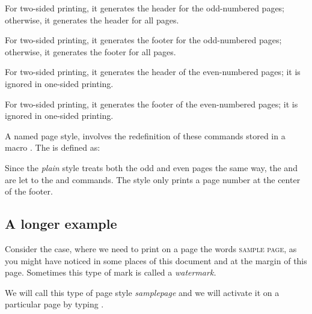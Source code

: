 \begin{marglist}
\item [\cs{oddhead}] For two-sided printing, it generates the header for the odd-numbered
pages; otherwise, it generates the header for all pages.

\item [\cs{oddfoot}] For two-sided printing, it generates the footer for the odd-numbered pages; otherwise, it generates the footer for all pages.

\item [\cs{evenhead}] For two-sided printing, it generates the header of the even-numbered
pages; it is ignored in one-sided printing.

\item [\cs{evenfoot}] For two-sided printing, it generates the footer of the even-numbered
pages; it is ignored in one-sided printing.

\end{marglist}
A named page style, involves the redefinition of these commands stored in a macro .
The  is defined as:




Since the \textit{plain} style treats both the odd and even pages the same way, the  and  are let to the  and  commands. The style only prints a page number at the center of the footer.


\subsection{A longer example}

\thispagestyle{samplepage}
Consider the case, where we need to print on a page the words \textsc{sample page}, as you might have noticed in some places of this document and at the margin of this page. Sometimes this type of mark is called a \textit{watermark.}

We will call this type of page style \textit{samplepage} and we will activate it on a particular page by typing .




